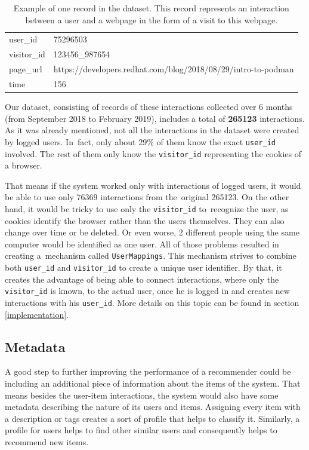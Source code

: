 \begin{table}[h!]
    \centering
    
    \begin{tabular}{ll}
    \hline
    \rowcolor[HTML]{EFEFEF}
    user\_id    & 75296503                                                      \\ 
    visitor\_id & 123456\_987654                                                \\ 
    \rowcolor[HTML]{EFEFEF}
    page\_url   & https://developers.redhat.com/blog/2018/08/29/intro-to-podman \\ 
    time        & 156                                                           \\ \hline
    \end{tabular}

    \caption{Example of one record in the dataset. This record represents an interaction between a user and a webpage in the form of a visit to this webpage.}
    \label{tab:dataset_record}
\end{table}
Our dataset, consisting of records of these interactions collected over 6 months (from September 2018 to February 2019), includes a total of \textbf{265123} interactions.
As it was already mentioned, not all the interactions in the dataset were created by logged users. In~fact, only about 29\% of them know the exact \texttt{user\_id} involved. The rest of them only know the \texttt{visitor\_id} representing the cookies of a browser. 

That means if the system worked only with interactions of logged users, it would be able to use only 76369 interactions from the~original 265123. On the other hand, it would be tricky to use only the \texttt{visitor\_id} to~recognize the user, as cookies identify the browser rather than the users themselves. They can also change over time or be deleted. Or even worse, 2 different people using the same computer would be identified as one user. All of those problems resulted in creating a~mechanism called \texttt{UserMappings}. This mechanism strives to combine both \texttt{user\_id} and \texttt{visitor\_id} to create a unique user identifier. By that, it creates the advantage of being able to connect interactions, where only the \texttt{visitor\_id} is known, to the actual user, once he is logged in and creates new interactions with his \texttt{user\_id}. More details on this topic can be found in section \ref{implementation}.


\subsection*{Metadata} \label{metadata}
A good step to further improving the performance of a recommender could be including an additional piece of information about the items of the system. That means besides the user-item interactions, the system would also have some metadata describing the nature of its users and items.  Assigning every item with a description or tags creates a sort of profile that helps to classify it. Similarly, a profile for users helps to find other similar users and consequently helps to recommend new items. 

